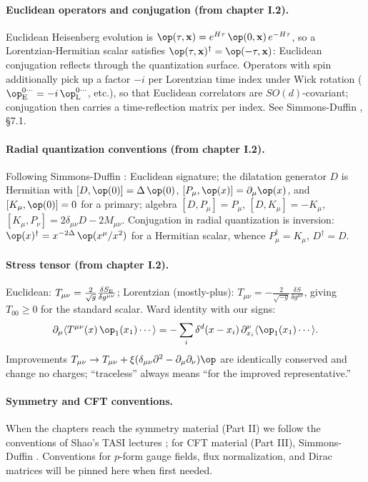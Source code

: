 \paragraph{Euclidean operators and conjugation (from chapter I.2).} Euclidean Heisenberg evolution is $\op(\tau, \mathbf{x}) = e^{H\tau}\,\op(0,\mathbf{x})\,e^{-H\tau}$, so a Lorentzian-Hermitian scalar satisfies $\op(\tau,\mathbf{x})^\dagger = \op(-\tau, \mathbf{x})$: Euclidean conjugation reflects through the quantization surface. Operators with spin additionally pick up a factor $-i$ per Lorentzian time index under Wick rotation ($\op_{\rm E}^{0\cdots} = -i\,\op_{\rm L}^{0\cdots}$, etc.), so that Euclidean correlators are $SO(d)$-covariant; conjugation then carries a time-reflection matrix per index. See Simmons-Duffin , \S7.1.

\paragraph{Radial quantization conventions (from chapter I.2).} Following Simmons-Duffin : Euclidean signature; the dilatation generator $D$ is Hermitian with $[D, \op(0)] = \Delta\,\op(0)$, $[P_\mu, \op(x)] = \partial_\mu \op(x)$, and $[K_\mu, \op(0)] = 0$ for a primary; algebra $[D, P_\mu] = P_\mu$, $[D, K_\mu] = -K_\mu$, $[K_\mu, P_\nu] = 2\delta_{\mu\nu}D - 2M_{\mu\nu}$. Conjugation in radial quantization is inversion: $\op(x)^{\dagger} = x^{-2\Delta}\,\op(x^\mu/x^2)$ for a Hermitian scalar, whence $P_\mu^\dagger = K_\mu$, $D^\dagger = D$.

\paragraph{Stress tensor (from chapter I.2).} Euclidean: $T_{\mu\nu} = \frac{2}{\sqrt g}\frac{\delta S_{\rm E}}{\delta g^{\mu\nu}}$; Lorentzian (mostly-plus): $T_{\mu\nu} = -\frac{2}{\sqrt{-g}}\frac{\delta S}{\delta g^{\mu\nu}}$, giving $T_{00} \ge 0$ for the standard scalar. Ward identity with our signs:
\begin{equation}
\partial_\mu \langle T^{\mu\nu}(x)\,\op_1(x_1)\cdots\rangle = -\sum_i \delta^d(x - x_i)\,\partial^\nu_{x_i}\langle \op_1(x_1)\cdots\rangle .
\end{equation}
Improvements $T_{\mu\nu} \to T_{\mu\nu} + \xi(\delta_{\mu\nu}\partial^2 - \partial_\mu\partial_\nu)\op$ are identically conserved and change no charges; ``traceless'' always means ``for the improved representative.''

\paragraph{Symmetry and CFT conventions.} When the chapters reach the symmetry material (Part II) we follow the conventions of Shao's TASI lectures ; for CFT material (Part III), Simmons-Duffin . Conventions for $p$-form gauge fields, flux normalization, and Dirac matrices will be pinned here when first needed.

